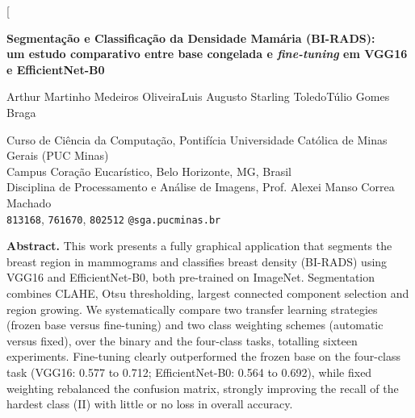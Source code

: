 \documentclass[twocolumn,a4paper,11pt]{article}
\title{}
\author{}
\date{}
\begin{document}
\twocolumn[{%
\centering
{\LARGE\bfseries Segmentação e Classificação da Densidade Mamária (BI\nobreakdash-RADS):\\[2pt]
um estudo comparativo entre base congelada e \emph{fine\nobreakdash-tuning} em VGG16 e EfficientNet\nobreakdash-B0\par}
\vspace{1.0em}
{\large Arthur Martinho Medeiros Oliveira\quad Luis Augusto Starling Toledo\quad Túlio Gomes Braga\par}
\vspace{0.5em}
{\normalsize Curso de Ciência da Computação, Pontifícia Universidade Católica de Minas Gerais (PUC Minas)\\
Campus Coração Eucarístico, Belo Horizonte, MG, Brasil\\
Disciplina de Processamento e Análise de Imagens, Prof. Alexei Manso Correa Machado\\
\texttt{813168}, \texttt{761670}, \texttt{802512} \texttt{@sga.pucminas.br}\par}
\vspace{1.4em}
\begin{minipage}{0.90\textwidth}
\small
\noindent\textbf{Abstract.}
This work presents a fully graphical application that segments the breast region in
mammograms and classifies breast density (BI\nobreakdash-RADS) using VGG16 and
EfficientNet\nobreakdash-B0, both pre\nobreakdash-trained on ImageNet. Segmentation combines CLAHE,
Otsu thresholding, largest connected component selection and region growing.
We systematically compare two transfer learning strategies (frozen base versus
fine\nobreakdash-tuning) and two class weighting schemes (automatic versus fixed), over the
binary and the four\nobreakdash-class tasks, totalling sixteen experiments. Fine\nobreakdash-tuning
clearly outperformed the frozen base on the four\nobreakdash-class task (VGG16: 0.577 to
0.712; EfficientNet\nobreakdash-B0: 0.564 to 0.692), while fixed weighting rebalanced the
confusion matrix, strongly improving the recall of the hardest class (II) with
little or no loss in overall accuracy.


\end{minipage}}
\end{document}
